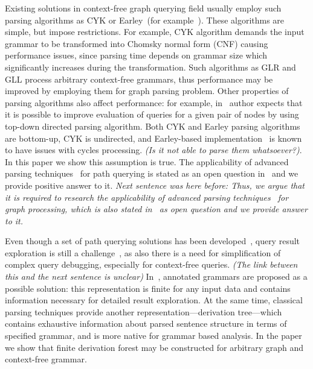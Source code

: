 \documentclass[runningheads,a4paper]{llncs}
\begin{document}

Existing solutions in context-free graph querying field usually employ such parsing algorithms as CYK or Earley~(for example~\cite{ConjCFPathQuery,CFGonRDF,GraphQueryWithEarley}). 
These algorithms are simple, but impose restrictions.
For example, CYK algorithm demands the input grammar to be transformed into Chomsky normal form (CNF) causing performance issues, since parsing time depends on grammar size which significantly increases during the transformation.
Such algorithms as GLR and GLL process arbitrary context-free grammars, thus performance may be improved by employing them for graph parsing problem.
Other properties of parsing algorithms also affect performance: for example, in~\cite{Hellings16} author expects that it is possible to improve evaluation of queries for a given pair of nodes by using top-down directed parsing algorithm.
Both CYK and Earley parsing algorithms are bottom-up, CYK is undirected, and Earley-based implementation~\cite{GraphQueryWithEarley} is known to have issues with cycles processing. \emph{(Is it not able to parse them whatsoever?)}. 
In this paper we show this assumption is true.
The applicability of advanced parsing techniques~\cite{Grune} for path querying is stated as an open question in~\cite{Hellings16} and we provide positive answer to it. \emph{Next sentence was here before: Thus, we argue that it is required to research the applicability of advanced parsing techniques~\cite{Grune} for graph processing, which is also stated in~\cite{Hellings16} as open question and we provide answer to it. }

Even though a set of path querying solutions has been developed~\cite{GraphQueryWithEarley,ConjCFPathQuery,QueryGraphWithData,RegularDBQuery}, query result exploration is still a challenge~\cite{hofman2015separabilityForRegQueryDebugging}, as also there is a need for simplification of complex query debugging, especially for context-free queries. \emph{(The link between this and the next sentence is unclear)}
In~\cite{Hellings16}, annotated grammars are proposed as a possible solution: this representation is finite for any input data and contains information necessary for detailed result exploration.
At the same time, classical parsing techniques provide another representation---derivation tree---which contains exhaustive information about parsed sentence structure in terms of specified grammar, and is more native for grammar based analysis.
In the paper we show that finite derivation forest may be constructed for arbitrary graph and context-free grammar.
\end{document}
